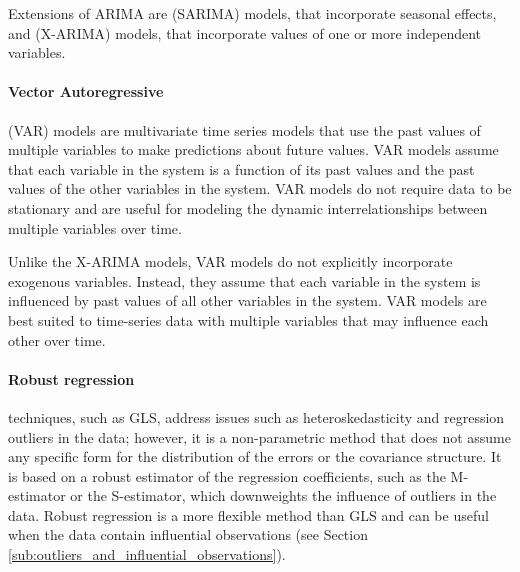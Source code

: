 Extensions of ARIMA are  (SARIMA) models, that incorporate seasonal effects, and  (X-ARIMA) models, that incorporate values of one or more independent variables.


\paragraph{Vector Autoregressive} %
\label{par:vector_autoregression}

 (VAR) models are multivariate time series models that use the past values of multiple variables to make predictions about future values. VAR models assume that each variable in the system is a function of its past values and the past values of the other variables in the system. VAR models do not require data to be stationary and are useful for modeling the dynamic interrelationships between multiple variables over time.

Unlike the X-ARIMA models, VAR models do not explicitly incorporate exogenous variables. Instead, they assume that each variable in the system is influenced by past values of all other variables in the system. VAR models are best suited to time-series data with multiple variables that may influence each other over time.


\paragraph{Robust regression} %
\label{par:robust_regression}

 techniques, such as GLS, address issues such as heteroskedasticity and regression outliers in the data; however, it is a non-parametric method that does not assume any specific form for the distribution of the errors or the covariance structure. It is based on a robust estimator of the regression coefficients, such as the M-estimator or the S-estimator, which downweights the influence of outliers in the data. Robust regression is a more flexible method than GLS and can be useful when the data contain influential observations (see Section \ref{sub:outliers_and_influential_observations}).




